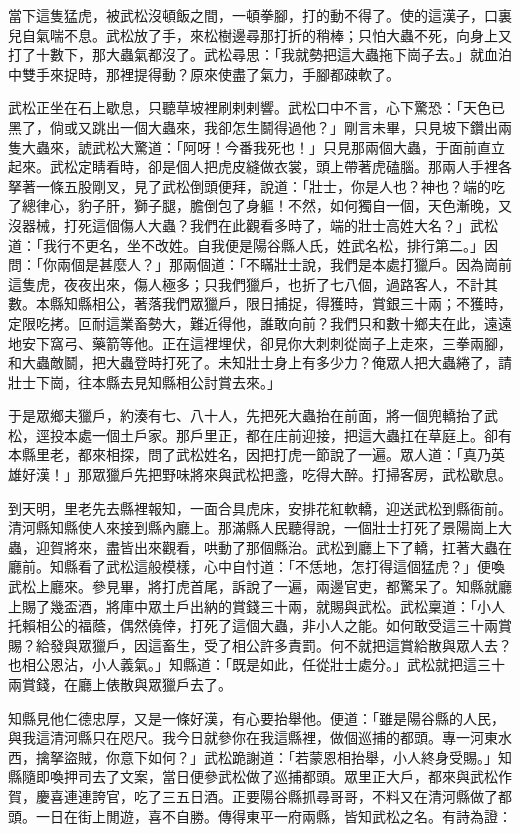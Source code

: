 當下這隻猛虎，被武松沒頓飯之間，一頓拳腳，打的動不得了。使的這漢子，口裏兒自氣喘不息。武松放了手，來松樹邊尋那打折的稍棒；只怕大蟲不死，向身上又打了十數下，那大蟲氣都沒了。武松尋思：「我就勢把這大蟲拖下崗子去。」就血泊中雙手來捉時，那裡提得動？原來使盡了氣力，手腳都疎軟了。

武松正坐在石上歇息，只聽草坡裡刷剌剌響。武松口中不言，心下驚恐：「天色已黑了，倘或又跳出一個大蟲來，我卻怎生鬬得過他？」剛言未畢，只見坡下鑽出兩隻大蟲來，諕武松大驚道：「阿呀！今番我死也！」只見那兩個大蟲，于面前直立起來。武松定睛看時，卻是個人把虎皮縫做衣裳，頭上帶著虎磕腦。那兩人手裡各拏著一條五股剛叉，見了武松倒頭便拜，說道：「壯士，你是人也？神也？端的吃了總律心，豹子肝，獅子腿，膽倒包了身軀！不然，如何獨自一個，天色漸晚，又沒器械，打死這個傷人大蟲？我們在此觀看多時了，端的壯士高姓大名？」武松道：「我行不更名，坐不改姓。自我便是陽谷縣人氏，姓武名松，排行第二。」因問：「你兩個是甚麼人？」那兩個道：「不瞞壯士說，我們是本處打獵戶。因為崗前這隻虎，夜夜出來，傷人極多；只我們獵戶，也折了七八個，過路客人，不計其數。本縣知縣相公，著落我們眾獵戶，限日捕捉，得獲時，賞銀三十兩；不獲時，定限吃拷。叵耐這業畜勢大，難近得他，誰敢向前？我們只和數十鄉夫在此，遠遠地安下窩弓、藥箭等他。正在這裡埋伏，卻見你大刺刺從崗子上走來，三拳兩腳，和大蟲敵鬬，把大蟲登時打死了。未知壯士身上有多少力？俺眾人把大蟲綣了，請壯士下崗，往本縣去見知縣相公討賞去來。」

于是眾鄉夫獵戶，約湊有七、八十人，先把死大蟲抬在前面，將一個兜轎抬了武松，逕投本處一個土戶家。那戶里正，都在庄前迎接，把這大蟲扛在草庭上。卻有本縣里老，都來相探，問了武松姓名，因把打虎一節說了一遍。眾人道：「真乃英雄好漢！」那眾獵戶先把野味將來與武松把盞，吃得大醉。打掃客房，武松歇息。

到天明，里老先去縣裡報知，一面合具虎床，安排花紅軟轎，迎送武松到縣衙前。清河縣知縣使人來接到縣內廳上。那滿縣人民聽得說，一個壯士打死了景陽崗上大蟲，迎賀將來，盡皆出來觀看，哄動了那個縣治。武松到廳上下了轎，扛著大蟲在廳前。知縣看了武松這般模樣，心中自忖道：「不恁地，怎打得這個猛虎？」便喚武松上廳來。參見畢，將打虎首尾，訴說了一遍，兩邊官吏，都驚呆了。知縣就廳上賜了幾盃酒，將庫中眾土戶出納的賞錢三十兩，就賜與武松。武松稟道：「小人托賴相公的福蔭，偶然僥倖，打死了這個大蟲，非小人之能。如何敢受這三十兩賞賜？給發與眾獵戶，因這畜生，受了相公許多責罰。何不就把這賞給散與眾人去？也相公恩沾，小人義氣。」知縣道：「既是如此，任從壯士處分。」武松就把這三十兩賞錢，在廳上俵散與眾獵戶去了。

知縣見他仁德忠厚，又是一條好漢，有心要抬舉他。便道：「雖是陽谷縣的人民，與我這清河縣只在咫尺。我今日就參你在我這縣裡，做個巡捕的都頭。專一河東水西，擒拏盜賊，你意下如何？」武松跪謝道：「若蒙恩相抬舉，小人終身受賜。」知縣隨即喚押司去了文案，當日便參武松做了巡捕都頭。眾里正大戶，都來與武松作賀，慶喜連連誇官，吃了三五日酒。正要陽谷縣抓尋哥哥，不料又在清河縣做了都頭。一日在街上閒遊，喜不自勝。傳得東平一府兩縣，皆知武松之名。有詩為證：

